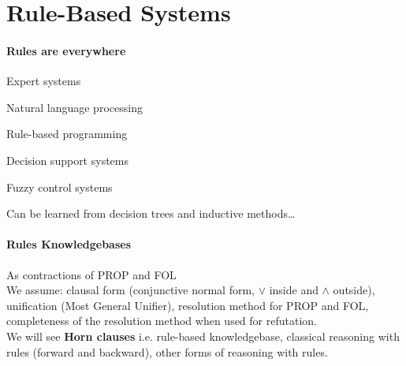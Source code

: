 \documentclass[10pt]{report}
\begin{document}
\section{Rule-Based Systems}
\paragraph{Rules are everywhere} \begin{list}{}{}
	\item Expert systems
	\item Natural language processing
	\item Rule-based programming
	\item Decision support systems
	\item Fuzzy control systems
	\item Can be learned from decision trees and inductive methods\ldots
\end{list}
\paragraph{Rules Knowledgebases} As contractions of PROP and FOL\\
We assume: clausal form (conjunctive normal form, $\vee$ inside and $\wedge$ outside), unification (Most General Unifier), resolution method for PROP and FOL, completeness of the resolution method when used for refutation.\\
We will see \textbf{Horn clauses} i.e. rule-based knowledgebase, classical reasoning with rules (forward and backward), other forms of reasoning with rules.
\end{document}
